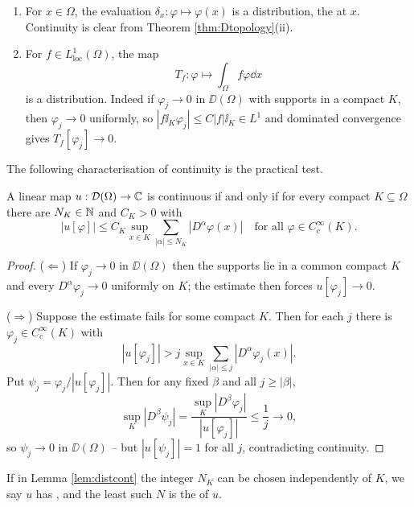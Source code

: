 \documentclass[a4paper]{scrartcl}
\begin{document}
\begin{example}\label{ex:distributions}
	\begin{enumerate}[label=(\alph*)]
		\item For $x \in \Omega$, the evaluation $\delta_x : \varphi\mapsto\varphi(x)$ is a distribution, the  at $x$. Continuity is clear from Theorem \ref{thm:Dtopology}(ii).
		\item For $f \in L^1_{\mathrm{loc}}(\Omega)$, the map
		$$T_f : \varphi \mapsto \int_\Omega f\varphi \dd x$$
		is a distribution. Indeed if $\varphi_j\to 0$ in $\DD(\Omega)$ with supports in a compact $K$, then $\varphi_j\to0$ uniformly, so $|f\ii_K\varphi_j|\le C|f|\ii_K \in L^1$ and dominated convergence gives $T_f[\varphi_j]\to0$.
	\end{enumerate}
\end{example}

The following characterisation of continuity is the practical test.

\begin{lemma}\label{lem:distcont}
	A linear map $u : \mathcal{D}(\Omega)\to\mathbb{C}$ is continuous if and only if for every compact $K\subseteq\Omega$ there are $N_K\in\mathbb{N}$ and $C_K>0$ with
	$$|u[\varphi]|\le C_K\sup_{x\in K}\sum_{|\alpha|\le N_K}|D^\alpha\varphi(x)| \quad \text{for all }\varphi\in C_c^\infty(K).$$
\end{lemma}

\begin{proof}
	($\Leftarrow$) If $\varphi_j\to0$ in $\DD(\Omega)$ then the supports lie in a common compact $K$ and every $D^\alpha \varphi_j\to0$ uniformly on $K$; the estimate then forces $u[\varphi_j]\to0$.

	($\Rightarrow$) Suppose the estimate fails for some compact $K$. Then for each $j$ there is $\varphi_j\in C_c^\infty(K)$ with
	$$|u[\varphi_j]|>j \sup_{x\in K}\sum_{|\alpha|\le j}|D^\alpha\varphi_j(x)|.$$
	Put $\psi_j=\varphi_j/|u[\varphi_j]|$. Then for any fixed $\beta$ and all $j \ge |\beta|$,
	$$\sup_K|D^\beta\psi_j| = \frac{\sup_K|D^\beta\varphi_j|}{|u[\varphi_j]|}\le\frac{1}{j}\to 0,$$
	so $\psi_j\to0$ in $\DD(\Omega)$ -- but $|u[\psi_j]|=1$ for all $j$, contradicting continuity.
\end{proof}

\begin{definition}[Order]
	If in Lemma \ref{lem:distcont} the integer $N_K$ can be chosen independently of $K$, we say $u$ has , and the least such $N$ is the  of $u$.
\end{definition}
\end{document}
